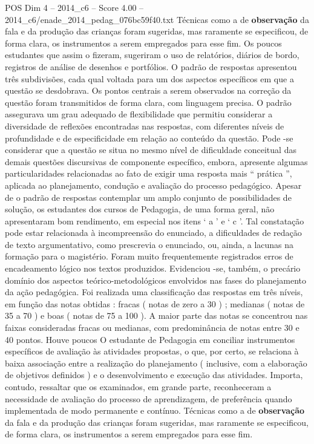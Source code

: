 \begin{textsample}{POS Dim 4 – 2014\_c6 – Score 4.00 – 2014\_c6/enade\_2014\_pedag\_076bc59f40.txt}
Técnicas como a de \textbf{observação} da fala e da produção das crianças foram sugeridas, mas raramente se especificou, de forma clara, os instrumentos a serem empregados para esse fim.
Os poucos estudantes que assim o fizeram, sugeriram o uso de relatórios, diários de bordo, registros de análise de desenhos e portfólios.
O padrão de respostas apresentou três subdivisões, cada qual voltada para um dos aspectos específicos em que a questão se desdobrava.
Os pontos centrais a serem observados na correção da questão foram transmitidos de forma clara, com linguagem precisa.
O padrão assegurava um grau adequado de flexibilidade que permitiu considerar a diversidade de reflexões encontradas nas respostas, com diferentes níveis de profundidade e de especificidade em relação ao conteúdo da questão.
Pode -se considerar que a questão se situa no mesmo nível de dificuldade conceitual das demais questões discursivas de componente específico, embora, apresente algumas particularidades relacionadas ao fato de exigir uma resposta mais “ prática ”, aplicada ao planejamento, condução e avaliação do processo pedagógico.
Apesar de o padrão de respostas contemplar um amplo conjunto de possibilidades de solução, os estudantes dos cursos de Pedagogia, de uma forma geral, não apresentaram bom rendimento, em especial nos itens ‘ a ’ e ‘ c ’.
Tal constatação pode estar relacionada à incompreensão do enunciado, a dificuldades de redação de texto argumentativo, como prescrevia o enunciado, ou, ainda, a lacunas na formação para o magistério.
Foram muito frequentemente registrados erros de encadeamento lógico nos textos produzidos.
Evidenciou -se, também, o precário domínio dos aspectos teórico-metodológicos envolvidos nas fases do planejamento da ação pedagógica.
Foi realizada uma classificação das respostas em três níveis, em função das notas obtidas : fracas ( notas de zero a 30 ) ; medianas ( notas de 35 a 70 ) e boas ( notas de 75 a 100 ).
A maior parte das notas se concentrou nas faixas consideradas fracas ou medianas, com predominância de notas entre 30 e 40 pontos.
Houve poucos O estudante de Pedagogia em conciliar instrumentos específicos de avaliação às atividades propostas, o que, por certo, se relaciona à baixa associação entre a realização do planejamento ( inclusive, com a elaboração de objetivos definidos ) e o desenvolvimento e execução das atividades.
Importa, contudo, ressaltar que os examinados, em grande parte, reconheceram a necessidade de avaliação do processo de aprendizagem, de preferência quando implementada de modo permanente e contínuo.
Técnicas como a de \textbf{observação} da fala e da produção das crianças foram sugeridas, mas raramente se especificou, de forma clara, os instrumentos a serem empregados para esse fim.

\end{textsample}
